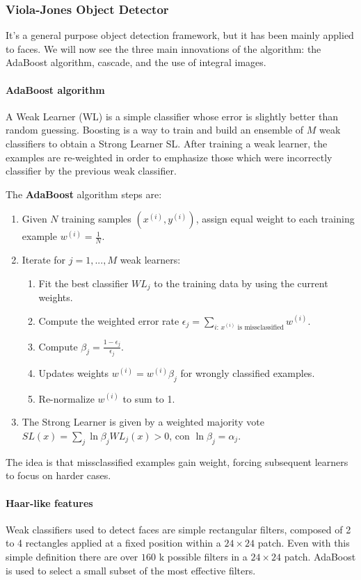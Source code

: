\subsubsection{Viola-Jones Object Detector}
It's a general purpose object detection framework, but it has been mainly applied to faces.
We will now see the three main innovations of the algorithm: the AdaBoost algorithm, cascade, and the use of integral images.

\paragraph{AdaBoost algorithm}
A Weak Learner (WL) is a simple classifier whose error is slightly better than random guessing.
Boosting is a way to train and build an ensemble of $M$ weak classifiers to obtain a Strong Learner SL.
After training a weak learner, the examples are re-weighted in order to emphasize those which were incorrectly classifier by the previous weak classifier.

The \textbf{AdaBoost} algorithm steps are:
\begin{enumerate}
  \item Given $N$ training samples $(x^(i), y^(i))$, assign equal weight to each training example $w^(i)=\frac{1}{N}$.
  \item Iterate for $j = 1, ..., M$ weak learners:
  \begin{enumerate}
    \item Fit the best classifier $WL_j$ to the training data by using the current weights.
    \item Compute the weighted error rate $\epsilon_j = \sum_{i:\, x^{(i)} \text{ is missclassified}} w^{(i)}$.
    \item Compute $\beta_j = \frac{1 - \epsilon_j}{\epsilon_j}$.
    \item Updates weights $w^(i) = w^(i)\beta_j$ for wrongly classified examples.
    \item Re-normalize $w^(i)$ to sum to 1.
  \end{enumerate}
  \item The Strong Learner is given by a weighted majority vote $SL(x) = \sum_{j} \ln \beta_j WL_j(x) > 0$, con $\ln \beta_j = \alpha_j$.
\end{enumerate}

The idea is that missclassified examples gain weight, forcing subsequent learners to focus on harder cases.

\paragraph{Haar-like features}
Weak classifiers used to detect faces are simple rectangular filters, composed of 2 to 4 rectangles applied at a fixed position within a $24 \times 24$ patch.
Even with this simple definition there are over $160$ k possible filters in a $24 \times 24$ patch.
AdaBoost is used to select a small subset of the most effective filters.


